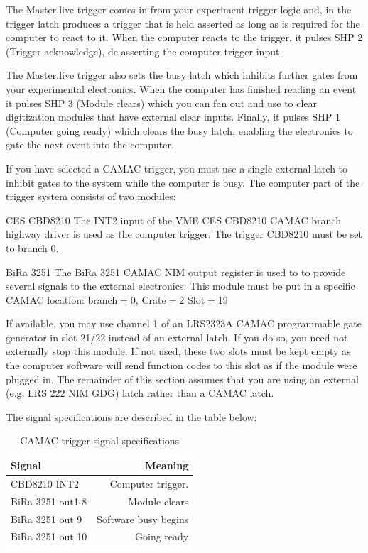 	The Master.live trigger comes in from your experiment trigger logic and, in the
	trigger latch produces a trigger that is held asserted as long as is required
	for the computer to react to it.  When the computer reacts to the trigger, it 
	pulses SHP 2 (Trigger acknowledge), de-asserting the computer trigger input.
	
	The Master.live trigger also sets the busy latch which inhibits further gates 
	from your experimental electronics. When the computer has finished reading an
	event it pulses SHP 3 (Module clears) which you can fan out and use to 
        clear digitization modules
	that have external clear inputs.  Finally, it pulses SHP 1 (Computer going
	ready) which clears the busy latch, enabling the electronics to gate the next
	event into the computer.
	
	    If you have selected a CAMAC trigger, you must use a single external latch 
	 to inhibit gates to the system while the computer is busy.  The computer
	 part of the trigger system consists of two modules:
	 \begin{description}
	    \item{CES CBD8210} The INT2 input of the VME CES CBD8210 CAMAC branch
	       highway driver is used as the computer trigger.	 The trigger CBD8210
	       must be set to branch 0.
	    \item{BiRa 3251}  The BiRa 3251 CAMAC NIM output register is used to
	       to provide several signals to the external electronics. This module
	       must be put in a specific CAMAC location: branch$=$0, Crate$=$2
	       Slot$=$19
	 \end{description}
	 If available, you may use channel 1 of an LRS2323A
	 CAMAC programmable gate generator in slot 21/22 instead of an external
	 latch.  If you do so, you need not externally stop this module.  If not used, these two
	 slots must be kept empty as the computer software will send function codes to
	 this slot as if the module were plugged in.  The remainder of this section assumes
	 that you are using an external (e.g. LRS 222 NIM GDG) latch rather than a CAMAC latch.
	 
	 The signal specifications are described in the table below:
	 \begin{table}[htb]
	 \caption{CAMAC trigger signal specifications}
	 \begin{tabular}{|l|r|}
	    \hline
	    {\bf Signal } 	& {\bf Meaning }		\\
	    \hline
	    CBD8210 INT2 	& Computer trigger.		\\
	    BiRa 3251 out1-8	& Module clears			\\
	    BiRa 3251 out 9	& Software busy begins		\\
	    BiRa 3251 out 10	& Going ready			\\
	    \hline
	 \end{tabular}
	 \end{table}
	 
